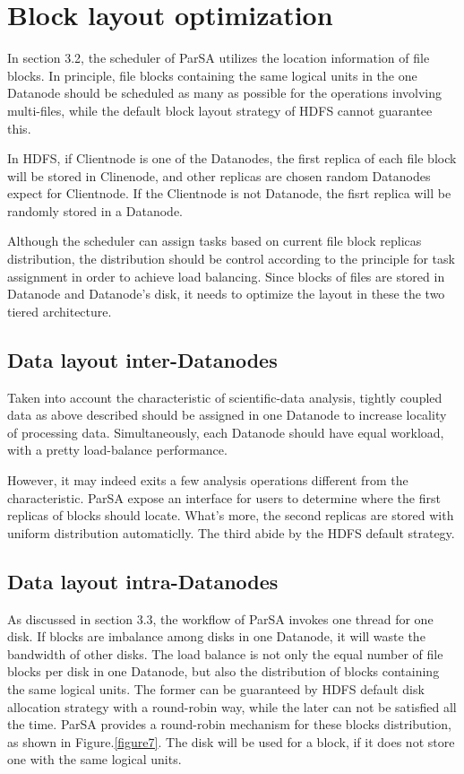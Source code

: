 \documentclass[preprint,12pt]{elsarticle}
\begin{document}
\section{Block layout optimization}
In section 3.2, the scheduler of ParSA utilizes the location information of file blocks. In principle, file blocks containing the same
logical units in the one Datanode should be scheduled as many as possible for the operations involving multi-files, while the default
block layout strategy of HDFS cannot guarantee this. \par
In HDFS, if Clientnode is one of the Datanodes, the first replica of each file block will be stored in Clinenode, and other replicas are 
chosen random Datanodes expect for Clientnode. If the Clientnode is not Datanode, the fisrt replica will be randomly stored in a 
Datanode. \par
Although the scheduler can assign tasks based on current file block replicas distribution, the distribution should be control according 
to the principle for task assignment in order to achieve load balancing. Since blocks of files are stored in Datanode and Datanode's disk,
it needs to optimize the layout in these the two tiered architecture. 

\subsection{Data layout inter-Datanodes}
Taken into account the characteristic of scientific-data analysis, tightly coupled data as above described should be assigned in one 
Datanode to increase locality of processing data. Simultaneously, each Datanode should have equal workload, with a pretty load-balance 
performance. \par 
However, it may indeed exits a few analysis operations different from the characteristic. ParSA expose an interface for users to determine
where the first replicas of blocks should locate. What's more, the second replicas are stored with uniform distribution automaticlly.
The third abide by the HDFS default strategy.  

\subsection{Data layout intra-Datanodes}
As discussed in section 3.3, the workflow of ParSA invokes one thread for one disk. If blocks are imbalance among disks in one Datanode, 
it will waste the bandwidth of other disks. The load balance is not only the equal number of file blocks per disk in one Datanode, but 
also the distribution of blocks containing the same logical units. The former can be guaranteed by HDFS default disk allocation strategy
with a round-robin way, while the later can not be satisfied all the time. ParSA provides a round-robin mechanism for these blocks 
distribution, as shown in Figure.\ref{figure7}. The disk will be used for a block, if it does not store one with the same logical 
units. \par
\end{document}
